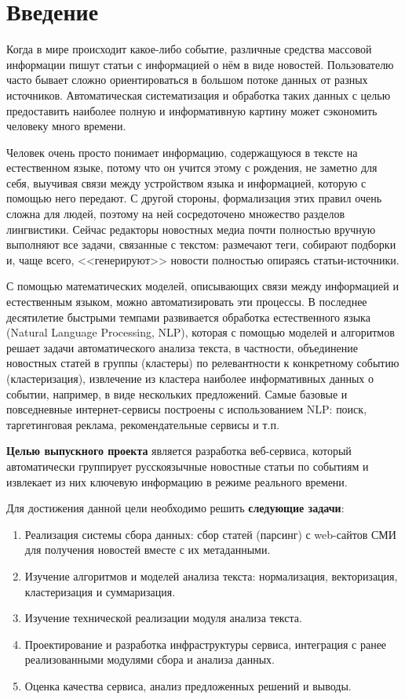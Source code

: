 \documentclass[a4paper, 14pt]{extarticle}
\begin{document}
%
%
\tableofcontents %
\clearpage

\section{Введение}


Когда в мире происходит какое-либо событие, различные средства массовой информации
пишут статьи с информацией о нём в виде новостей. Пользователю часто бывает сложно ориентироваться в большом потоке данных от разных источников. Автоматическая систематизация и обработка таких данных с целью предоставить наиболее полную и информативную картину может сэкономить человеку много времени. 

Человек очень просто понимает информацию, содержащуюся в тексте на естественном языке, потому что он учится этому с рождения, не заметно для себя, выучивая связи между устройством языка и информацией, которую с помощью него передают. С другой стороны, формализация этих правил очень сложна для людей, поэтому на ней сосредоточено множество разделов лингвистики. Сейчас редакторы новостных медиа почти полностью вручную выполняют все задачи, связанные с текстом: размечают теги, собирают подборки и, чаще всего, <<генерируют>> новости полностью опираясь статьи-источники.

С помощью математических моделей, описывающих связи между информацией и естественным языком, можно автоматизировать эти процессы. В последнее десятилетие быстрыми темпами развивается обработка естественного языка (Natural Language Processing, NLP), которая с помощью моделей и алгоритмов решает задачи автоматического анализа текста, в частности, объединение новостных статей в группы (кластеры) по релевантности к конкретному событию (кластеризация), извлечение из кластера наиболее информативных данных о событии, например, в виде нескольких предложений. Самые базовые и повседневные интернет-сервисы построены с использованием NLP: поиск, таргетинговая реклама, рекомендательные сервисы и т.п.

{\bf Целью выпускного проекта} является разработка веб-сервиса, который автоматически
группирует русскоязычные новостные статьи по событиям и извлекает из них ключевую информацию в режиме реального времени. 

Для достижения данной цели необходимо решить {\bf следующие задачи}:
\begin{enumerate}
	\item Реализация системы сбора данных: сбор статей (парсинг) с web-сайтов СМИ для получения новостей вместе с их метаданными.
	\item Изучение алгоритмов и моделей анализа текста: нормализация, векторизация, кластеризация и суммаризация.
	\item Изучение технической реализации модуля анализа текста.
	\item Проектирование и разработка инфраструктуры сервиса, интеграция с ранее реализованными модулями сбора и анализа данных.
	\item Оценка качества сервиса, анализ предложенных решений и выводы.
\end{enumerate}
\end{document}
